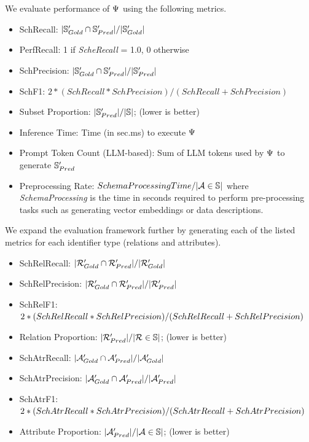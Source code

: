 We evaluate performance of $\Psi$ using the following metrics.
\begin{itemize}
  \item SchRecall: $|\mathbb{S}'_{Gold} \cap \mathbb{S}'_{Pred}| / |\mathbb{S}'_{Gold}|$
  \item PerfRecall: 1 if \emph{ScheRecall} = 1.0, 0 otherwise
  \item SchPrecision: $|\mathbb{S}'_{Gold} \cap \mathbb{S}'_{Pred}| / |\mathbb{S}'_{Pred}|$
  \item SchF1: $2 * (SchRecall * SchPrecision) / (SchRecall + SchPrecision)$
  \item Subset Proportion: $|\mathbb{S}'_{Pred}| / |\mathbb{S}|$; (lower is better)
  \item Inference Time: Time (in sec.ms) to execute $\Psi$
  \item Prompt Token Count (LLM-based): Sum of LLM tokens used by $\Psi$ to generate $\mathbb{S}'_{Pred}$
  \item Preprocessing Rate: $SchemaProcessingTime / |\mathcal{A} \in \mathbb{S}|$ where \emph{SchemaProcessing} is the time in seconds required to perform pre-processing tasks such as generating vector embeddings or data descriptions.
\end{itemize}
We expand the evaluation framework further by generating each of the listed metrics for each identifier type (relations and attributes).
\begin{itemize}
  \item SchRelRecall: $|\mathcal{R}'_{Gold} \cap \mathcal{R}'_{Pred}| / |\mathcal{R}'_{Gold}|$
  \item SchRelPrecision: $|\mathcal{R}'_{Gold} \cap \mathcal{R}'_{Pred}| / |\mathcal{R}'_{Pred}|$
  \item SchRelF1: $2 * (SchRelRecall * SchRelPrecision) / \\ (SchRelRecall + SchRelPrecision)$
  \item Relation Proportion: $|\mathcal{R}'_{Pred}| / |\mathcal{R} \in \mathbb{S}|$; (lower is better)
  \item SchAtrRecall: $|\mathcal{A}'_{Gold} \cap \mathcal{A}'_{Pred}| / |\mathcal{A}'_{Gold}|$
  \item SchAtrPrecision: $|\mathcal{A}'_{Gold} \cap \mathcal{A}'_{Pred}| / |\mathcal{A}'_{Pred}|$
  \item SchAtrF1: $2 * (SchAtrRecall * SchAtrPrecision) / \\ (SchAtrRecall + SchAtrPrecision)$
  \item Attribute Proportion: $|\mathcal{A}'_{Pred}| / |\mathcal{A} \in \mathbb{S}|$; (lower is better)
\end{itemize}

